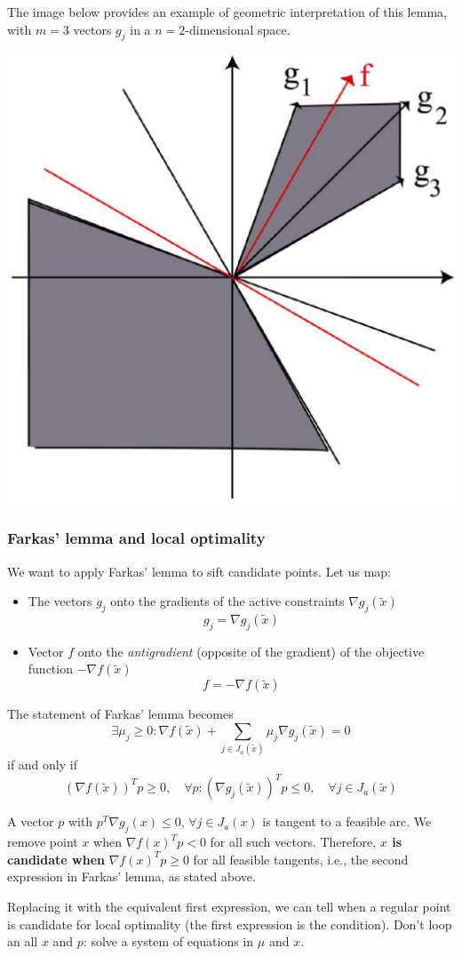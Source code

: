 The image below provides an example of geometric interpretation of this lemma, with $m = 3$ vectors $g_j$ in a $n = 2$-dimensional space.
\begin{center}
	\includegraphics[width=0.45\columnwidth]{img/bdm/mathprog/farkasex}
\end{center}

\subsubsection{Farkas' lemma and local optimality}

We want to apply Farkas' lemma to sift candidate points. Let us map: 
\begin{itemize}
	\item The vectors $g_j$ onto the gradients of the active constraints $\nabla g_j (\tilde x)$
	$$ g_j = \nabla g_j (\tilde x) $$
	
	\item Vector $f$ onto the \textit{antigradient} (opposite of the gradient) of the objective function $- \nabla f (\tilde x)$
	$$ f = - \nabla f (\tilde x) $$
\end{itemize}

The statement of Farkas' lemma becomes
$$ \exists \mu_j \geq 0 : \nabla f (\tilde x) + \sum_{j \in J_a (\tilde x)} \mu_j \nabla g_j (\tilde x) = 0 $$
if and only if
$$ (\nabla f (\tilde x))^T p \geq 0, \quad \forall p : (\nabla g_j (\tilde x))^T p \leq 0, \quad \forall j \in J_a (\tilde x) $$

A vector $p$ with $p^T \nabla g_j (x) \leq 0$, $\forall j \in J_a (x)$ is tangent to a feasible arc. We remove point $x$ when $\nabla f(x)^T p < 0$ for all such vectors. Therefore, \textbf{$x$ is candidate when} $\nabla f(x)^T p \geq 0$ for all feasible tangents, i.e., the second expression in Farkas' lemma, as stated above.

Replacing it with the equivalent first expression, we can tell when a regular point is candidate for local optimality (the first expression is the condition). Don't loop an all $x$ and $p$: solve a system of equations in $\mu$ and $x$.

